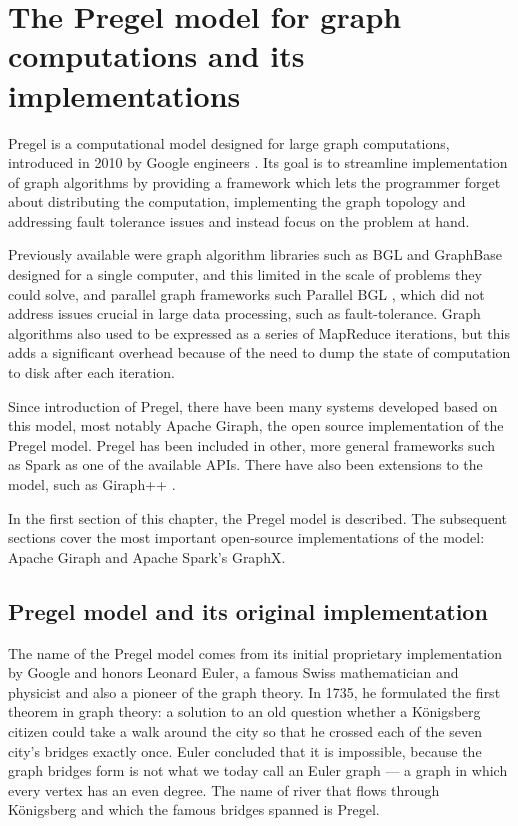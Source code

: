 
\chapter{The Pregel model for graph computations and its implementations}\label{r:pregel}

Pregel is a computational model designed for large graph computations, introduced in 2010 by Google engineers \cite{pregel}. Its goal is to streamline implementation of graph algorithms by providing a framework which lets the programmer forget about distributing the computation, implementing the graph topology and addressing fault tolerance issues and instead focus on the problem at hand.

Previously available were graph algorithm libraries such as BGL\cite{bgl} and GraphBase \cite{GraphBase} designed for a single computer, and this limited in the scale of problems they could solve, and parallel graph frameworks such Parallel BGL \cite{parallelbgl}, which did not address issues crucial in large data processing, such as fault-tolerance. Graph algorithms also used to be expressed as a series of MapReduce iterations, but this adds a significant overhead because of the need to dump the state of computation to disk after each iteration.

Since introduction of Pregel, there have been many systems developed based on this model, most notably Apache Giraph, the open source implementation of the Pregel model. Pregel has been included in other, more general frameworks such as Spark as one of the available APIs. There have also been extensions to the model, such as Giraph++ \cite{giraphpp}.

In the first section of this chapter, the Pregel model is described. The subsequent sections cover the most important open-source implementations of the model: Apache Giraph and Apache Spark's GraphX.

\section{Pregel model and its original implementation}

The name of the Pregel model comes from its initial proprietary implementation by Google and honors Leonard Euler, a famous Swiss mathematician and physicist and also a pioneer of the graph theory. In 1735, he formulated the first theorem in graph theory: a solution to an old question whether a Königsberg citizen could take a walk around the city so that he crossed each of the seven city's bridges exactly once. Euler concluded that it is impossible, because the graph bridges form is not what we today call an Euler graph --- a graph in which every vertex has an even degree. The name of river that flows through Königsberg and which the famous bridges spanned is Pregel.

